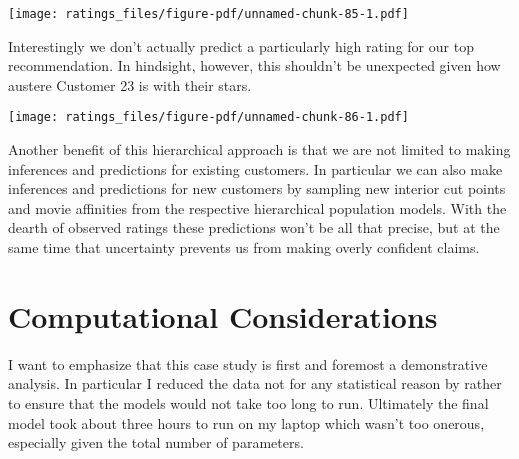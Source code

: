 \documentclass[
  letterpaper,
  DIV=11,
  numbers=noendperiod]{scrartcl}
\newenvironment{Shaded}{\begin{snugshade}}{\end{snugshade}}
\newcommand{\AttributeTok}[1]{\textcolor[rgb]{0.40,0.45,0.13}{#1}}
\newcommand{\DecValTok}[1]{\textcolor[rgb]{0.68,0.00,0.00}{#1}}
\newcommand{\FloatTok}[1]{\textcolor[rgb]{0.68,0.00,0.00}{#1}}
\newcommand{\FunctionTok}[1]{\textcolor[rgb]{0.28,0.35,0.67}{#1}}
\newcommand{\NormalTok}[1]{\textcolor[rgb]{0.00,0.23,0.31}{#1}}
\newcommand{\SpecialCharTok}[1]{\textcolor[rgb]{0.37,0.37,0.37}{#1}}
\newcommand{\StringTok}[1]{\textcolor[rgb]{0.13,0.47,0.30}{#1}}
\begin{document}
\texttt{[image: ratings\_files/figure-pdf/unnamed-chunk-85-1.pdf]}

Interestingly we don't actually predict a particularly high rating for
our top recommendation. In hindsight, however, this shouldn't be
unexpected given how austere Customer 23 is with their stars.

\begin{Shaded}
\end{Shaded}

\texttt{[image: ratings\_files/figure-pdf/unnamed-chunk-86-1.pdf]}

Another benefit of this hierarchical approach is that we are not limited
to making inferences and predictions for existing customers. In
particular we can also make inferences and predictions for new customers
by sampling new interior cut points and movie affinities from the
respective hierarchical population models. With the dearth of observed
ratings these predictions won't be all that precise, but at the same
time that uncertainty prevents us from making overly confident claims.

\section{Computational
Considerations}\label{computational-considerations}

I want to emphasize that this case study is first and foremost a
demonstrative analysis. In particular I reduced the data not for any
statistical reason by rather to ensure that the models would not take
too long to run. Ultimately the final model took about three hours to
run on my laptop which wasn't too onerous, especially given the total
number of parameters.
\end{document}
